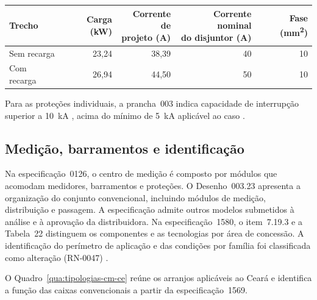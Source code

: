 \par\noindent
\begin{minipage}{\linewidth}
  \label{qua:alimentadores-apartamentos}
  \vspace{0.7\baselineskip}
  \centering
  {\small
  \renewcommand{\arraystretch}{1.15}
  \setlength{\tabcolsep}{4pt}
  \begin{tabular}{|l|r|r|r|r|}
    \hline
    \textbf{Trecho} & \textbf{Carga (kW)} & \shortstack{\textbf{Corrente de}\\\textbf{projeto (A)}} & \shortstack{\textbf{Corrente nominal}\\\textbf{do disjuntor (A)}} & \textbf{Fase (mm\textsuperscript{2})} \\\hline
    Sem recarga & 23,24 & 38,39 & 40 & 10 \\\hline
    Com recarga & 26,94 & 44,50 & 50 & 10 \\\hline
  \end{tabular}
  }
\end{minipage}
\par

Para as proteções individuais, a prancha~003 indica capacidade de interrupção superior a 10~kA \cite[prancha~003]{palatiumpranchas2025}, acima do mínimo de 5~kA aplicável ao caso \cite[item~7.25.2]{enel1580}.

\subsection{Medição, barramentos e identificação}

Na especificação~0126, o centro de medição é composto por módulos que acomodam medidores, barramentos e proteções. O Desenho~003.23 apresenta a organização do conjunto convencional, incluindo módulos de medição, distribuição e passagem. A especificação admite outros modelos submetidos à análise e à aprovação da distribuidora. Na especificação~1580, o item~7.19.3 e a Tabela~22 distinguem os componentes e as tecnologias por área de concessão. A identificação do perímetro de aplicação e das condições por família foi classificada como alteração (RN-0047) \cite[itens~7.7.4--7.7.6 e Desenho~003.23]{enel0126}\cite[item~7.19.3 e tabela~22]{enel1580}.

O Quadro~\ref{qua:tipologias-cm-ce} reúne os arranjos aplicáveis ao Ceará e identifica a função das caixas convencionais a partir da especificação~1569.

